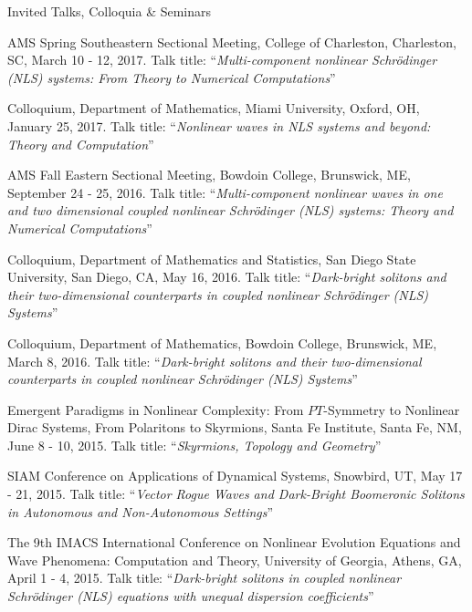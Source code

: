 \documentclass[10pt]{article} %
\begin{document}
\begin{section}{Invited Talks, Colloquia \& Seminars}
\begin{etaremune}
\item   AMS Spring Southeastern Sectional Meeting, College of Charleston, Charleston, SC, March 10 - 12, 2017.
        Talk title: ``\textit{Multi-component nonlinear Schr\"odinger (NLS) systems: From Theory to Numerical Computations}''

\item   Colloquium, Department of Mathematics, Miami University, Oxford, OH, January 25, 2017.
        Talk title: ``\textit{Nonlinear waves in NLS systems and beyond: Theory and Computation}''

\item   AMS Fall Eastern Sectional Meeting, Bowdoin College, Brunswick, ME, September 24 - 25, 2016.
        Talk title: ``\textit{Multi-component nonlinear waves in one and two dimensional coupled nonlinear
        Schr\"odinger (NLS) systems: Theory and Numerical Computations}''

\item   Colloquium, Department of Mathematics and Statistics, San Diego State University, San Diego, CA, May 16, 2016.
        Talk title: ``\textit{Dark-bright solitons and their two-dimensional counterparts in coupled nonlinear Schr\"odinger (NLS) Systems}''

\item   Colloquium, Department of Mathematics, Bowdoin College, Brunswick, ME, March 8, 2016.
        Talk title: ``\textit{Dark-bright solitons and their two-dimensional counterparts in coupled nonlinear Schr\"odinger (NLS) Systems}''

\item   Emergent Paradigms in Nonlinear Complexity: From $PT$-Symmetry to Nonlinear Dirac Systems, From Polaritons to Skyrmions, %
        Santa Fe Institute, Santa Fe, NM, June 8 - 10, 2015. Talk title: ``\textit{Skyrmions, Topology and Geometry}''

\item   SIAM Conference on Applications of Dynamical Systems, Snowbird, UT, May 17 - 21, 2015. Talk title: %
        ``\textit{Vector Rogue Waves and Dark-Bright Boomeronic Solitons in Autonomous and Non-Autonomous Settings}''

\item   The 9th IMACS International Conference on Nonlinear Evolution Equations and Wave Phenomena: Computation and Theory, %
        University of Georgia, Athens, GA, April 1 - 4, 2015. Talk title: %
        ``\textit{Dark-bright solitons in coupled nonlinear Schr\"odinger (NLS) equations with unequal dispersion coefficients}''


\end{etaremune}
\end{section}
\end{document}
